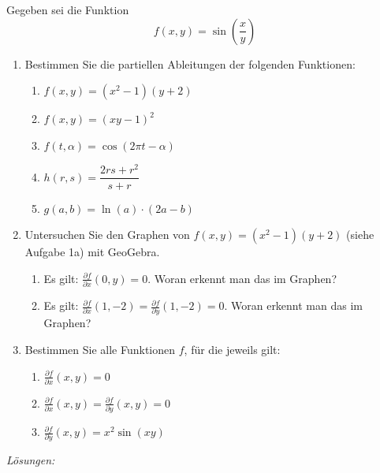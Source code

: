 \begin{bsp}
	{}{}
	Gegeben sei die Funktion
	\[
		f(x, y) = \sin\left(\frac{x}{y}\right)
	\]

	\vspace*{5cm}



\end{bsp}

\begin{ueb}
	{}{}

	\begin{enumerate}
		\item Bestimmen Sie die partiellen Ableitungen der folgenden Funktionen:
		      \begin{enumerate}
			      \item \( f(x, y) = (x^2 - 1)(y + 2) \)
			      \item \( f(x, y) = (xy - 1)^2 \)
			      \item \( f(t, \alpha) = \cos(2\pi t - \alpha) \)
			      \item \( h(r, s) = \dfrac{2rs + r^2}{s + r} \)
			      \item \( g(a, b) = \ln(a) \cdot (2a - b) \)
		      \end{enumerate}

		\item Untersuchen Sie den Graphen von \( f(x, y) = (x^2 - 1)(y + 2) \) (siehe Aufgabe 1a) mit GeoGebra.
		      \begin{enumerate}
			      \item Es gilt: \( \frac{\partial f}{\partial x}(0, y) = 0 \). Woran erkennt man das im Graphen?
			      \item Es gilt: \( \frac{\partial f}{\partial x}(1, -2) = \frac{\partial f}{\partial y}(1, -2) = 0 \). Woran erkennt man das im Graphen?
		      \end{enumerate}

		\item Bestimmen Sie alle Funktionen \( f \), für die jeweils gilt:
		      \begin{enumerate}
			      \item \( \frac{\partial f}{\partial x}(x, y) = 0 \)
			      \item \( \frac{\partial f}{\partial x}(x, y) = \frac{\partial f}{\partial y}(x, y) = 0 \)
			      \item \( \frac{\partial f}{\partial y}(x, y) = x^2 \sin(xy) \)
		      \end{enumerate}
	\end{enumerate}
\end{ueb}
\clearpage
\emph{Lösungen:}


